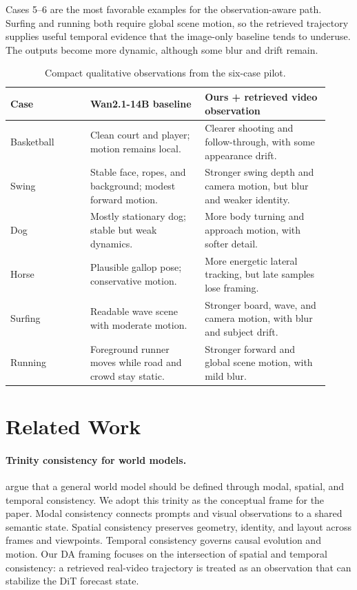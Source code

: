 \documentclass{article}
\begin{document}
Cases 5--6 are the most favorable examples for the observation-aware path. Surfing and running both require global scene motion, so the retrieved trajectory supplies useful temporal evidence that the image-only baseline tends to underuse. The outputs become more dynamic, although some blur and drift remain.

\begin{table}[H]
    \centering
    \scriptsize
    \setlength{\tabcolsep}{2pt}
    \renewcommand{\arraystretch}{0.92}
    \caption{Compact qualitative observations from the six-case pilot.}
    \label{tab:qualitative-six-case}
    \begin{tabular}{p{0.23\linewidth}p{0.33\linewidth}p{0.36\linewidth}}
        \toprule
        Case & Wan2.1-14B baseline & Ours + retrieved video observation \\
        \midrule
        Basketball & Clean court and player; motion remains local. & Clearer shooting and follow-through, with some appearance drift. \\
        Swing & Stable face, ropes, and background; modest forward motion. & Stronger swing depth and camera motion, but blur and weaker identity. \\
        Dog & Mostly stationary dog; stable but weak dynamics. & More body turning and approach motion, with softer detail. \\
        Horse & Plausible gallop pose; conservative motion. & More energetic lateral tracking, but late samples lose framing. \\
        Surfing & Readable wave scene with moderate motion. & Stronger board, wave, and camera motion, with blur and subject drift. \\
        Running & Foreground runner moves while road and crowd stay static. & Stronger forward and global scene motion, with mild blur. \\
        \bottomrule
    \end{tabular}
\end{table}

\section{Related Work}
\label{app:related-work}

\paragraph{Trinity consistency for world models.}
\citet{trinityconsistency2026} argue that a general world model should be defined through modal, spatial, and temporal consistency. We adopt this trinity as the conceptual frame for the paper. Modal consistency connects prompts and visual observations to a shared semantic state. Spatial consistency preserves geometry, identity, and layout across frames and viewpoints. Temporal consistency governs causal evolution and motion. Our DA framing focuses on the intersection of spatial and temporal consistency: a retrieved real-video trajectory is treated as an observation that can stabilize the DiT forecast state.
\end{document}
